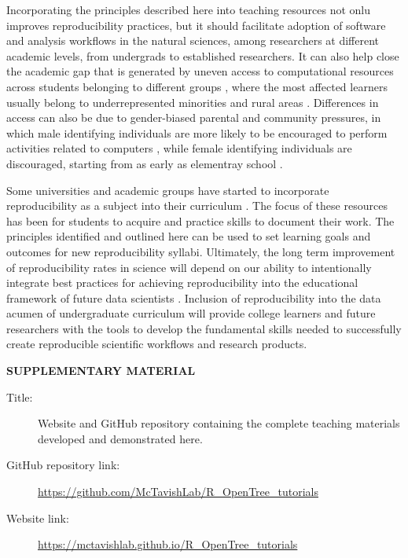 \documentclass[12pt]{article}
\begin{document}
Incorporating the principles described here into teaching resources not onlu improves reproducibility practices, but it should facilitate adoption of software and analysis workflows in the natural sciences, among researchers at different academic levels, from undergrads to established researchers.
It can also help close the academic gap that is generated by uneven access to computational resources across students belonging to different groups \citep{kewalramani2018student}, where the most affected learners usually belong to underrepresented minorities and rural areas \citep{warner2021quantifying}.
Differences in access can also be due to gender-biased parental and community pressures, in which male identifying individuals are more likely to be encouraged to perform activities related to computers \citep{google2016diversity}, while female identifying individuals are discouraged, starting from as early as elementray school \citep{master_gender_2021}.

Some universities and academic groups have started to incorporate reproducibility as a subject into their curriculum
\citep{uwlibraries2022, nigms2022, psyteachr2022}.
The focus of these resources has been for students to acquire and practice skills to document their work.
The principles identified and outlined here can be used to set learning goals and outcomes for new reproducibility syllabi.
Ultimately, the long term improvement of reproducibility rates in science will depend on our ability to intentionally integrate best practices for achieving reproducibility into the educational framework of future data scientists \citep{nasem2018data}.
Inclusion of reproducibility into the data acumen of undergraduate curriculum will provide college learners and future researchers with the tools to develop the fundamental skills needed to successfully create reproducible scientific workflows and research products.


\bigskip
\begin{center}
{\large\bf SUPPLEMENTARY MATERIAL}
\end{center}

\begin{description}

\item[Title:] Website and GitHub repository containing the complete teaching materials developed and demonstrated here.

\item[GitHub repository link:] \url{https://github.com/McTavishLab/R_OpenTree_tutorials}

\item[Website link:] \url{https://mctavishlab.github.io/R_OpenTree_tutorials}

\end{description}


\end{document}
